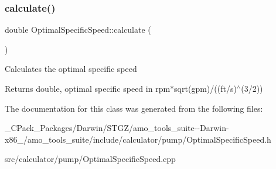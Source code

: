 \subsubsection{\texorpdfstring{calculate()}{calculate()}\hspace{0.1cm}{\footnotesize\ttfamily [3/3]}}
{\footnotesize\ttfamily double Optimal\+Specific\+Speed\+::calculate (\begin{DoxyParamCaption}{ }\end{DoxyParamCaption})}

Calculates the optimal specific speed \begin{DoxyReturn}{Returns}
double, optimal specific speed in rpm$\ast$sqrt(gpm)/((ft/s)$^\wedge$(3/2)) 
\end{DoxyReturn}


The documentation for this class was generated from the following files\+:\begin{DoxyCompactItemize}
\item 
\+\_\+\+C\+Pack\+\_\+\+Packages/\+Darwin/\+S\+T\+G\+Z/amo\+\_\+tools\+\_\+suite-\/-\/\+Darwin-\/x86\+\_/amo\+\_\+tools\+\_\+suite/include/calculator/pump/Optimal\+Specific\+Speed.\+h\item 
src/calculator/pump/Optimal\+Specific\+Speed.\+cpp\end{DoxyCompactItemize}
